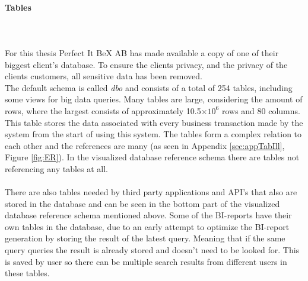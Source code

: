 \documentclass{cslthse-msc}
\begin{document}
\paragraph*{Tables}\mbox{}\\\\
For this thesis Perfect It BeX AB has made available a copy of one of their biggest client's database. To ensure the clients privacy, and the privacy of the clients customers, all sensitive data has been removed. \\ 
The default schema is called \textit{dbo} and consists of a total of 254 tables, including some views for big data queries. Many tables are large, considering the amount of rows, where the largest consists of approximately 10.5$\times 10^6$ rows and 80 columns. This table stores the data associated with every business transaction made by the system from the start of using this system. The tables form a complex relation to each other and the references are many (as seen in Appendix \ref{sec:appTabIll}, Figure \ref{fig:ER}). In the visualized database reference schema there are tables not referencing any tables at all.\\\\
There are also tables needed by third party applications and API's that also are stored in the database and can be seen in the bottom part of the visualized database reference schema mentioned above. Some of the BI-reports have their own tables in the database, due to an early attempt to optimize the BI-report generation by storing the result of the latest query. Meaning that if the same query queries the result is already stored and doesn't need to be looked for. This is saved by user so there can be multiple search results from different users in these tables.
\end{document}

